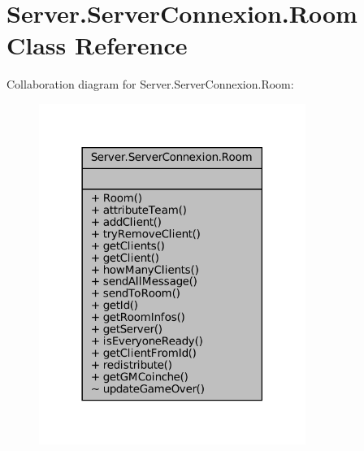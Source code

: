 \hypertarget{classServer_1_1ServerConnexion_1_1Room}{}\section{Server.\+Server\+Connexion.\+Room Class Reference}
\label{classServer_1_1ServerConnexion_1_1Room}


Collaboration diagram for Server.\+Server\+Connexion.\+Room\+:
\nopagebreak
\begin{figure}[H]
\begin{center}
\leavevmode
\includegraphics[width=246pt]{classServer_1_1ServerConnexion_1_1Room__coll__graph}
\end{center}
\end{figure}
